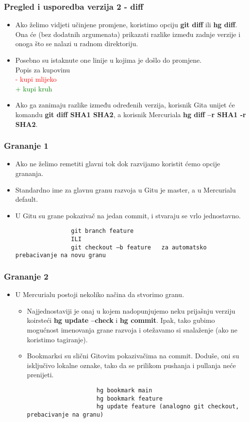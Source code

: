 \documentclass{beamer}
\begin{document}
	\begin{frame}
		\frametitle{Pregled i usporedba verzija 2 - diff}
		\begin{itemize}
			\item Ako želimo vidjeti učinjene promjene, koristimo opciju \textbf{git diff} ili \textbf{hg diff}. Ona će (bez dodatnih argumenata) prikazati razlike između zadnje verzije i onoga što se nalazi u radnom direktoriju.
			\item Posebno su istaknute one linije u kojima je došlo do promjene. \\
				Popis za kupovinu\\
				\textcolor{red}{- kupi mlijeko}\\
				\textcolor{green}{+ kupi kruh}
			\item Ako ga zanimaju razlike između određenih verzija, korisnik Gita unijet će komandu \textbf{git diff SHA1 SHA2}, a korisnik Mercuriala \textbf{hg diff –r SHA1 -r SHA2}.
		\end{itemize}
	\end{frame}

	\begin{frame}
		\frametitle{Grananje 1}
		\begin{itemize}
			\item Ako ne želimo remetiti glavni tok dok razvijamo koristit ćemo opcije grananja.
			\item Standardno ime za glavnu granu razvoja u Gitu je master, a u Mercurialu default.
			\item U Gitu su grane pokazivač na jedan commit, i stvaraju se vrlo jednostavno.
			\begin{lstlisting}
				git branch feature
				ILI
				git checkout –b feature   za automatsko prebacivanje na novu granu
			\end{lstlisting}
		\end{itemize}
	\end{frame}
 
	\begin{frame}
		\frametitle{Grananje 2}
		\begin{itemize}
			\item U Mercurialu postoji nekoliko načina da stvorimo granu. 
			\begin{itemize}
				\item Najjednostaviji je onaj u kojem nadopunjujemo neku prijašnju verziju koirsteći \textbf{hg update --check} i \textbf{hg commit}. Ipak, tako gubimo mogućnost imenovanja grane razvoja i otežavamo si snalaženje (ako ne koristimo tagiranje).
				\item Bookmarksi su slični Gitovim pokazivačima na commit. Doduše, oni su isključivo lokalne oznake, tako da se prilikom pushanja i pullanja neće prenijeti.
				\begin{lstlisting}
					hg bookmark main
					hg bookmark feature
					hg update feature (analogno git checkout, prebacivanje na granu)
				\end{lstlisting}
			\end{itemize}
		\end{itemize}
	\end{frame}
\end{document}
